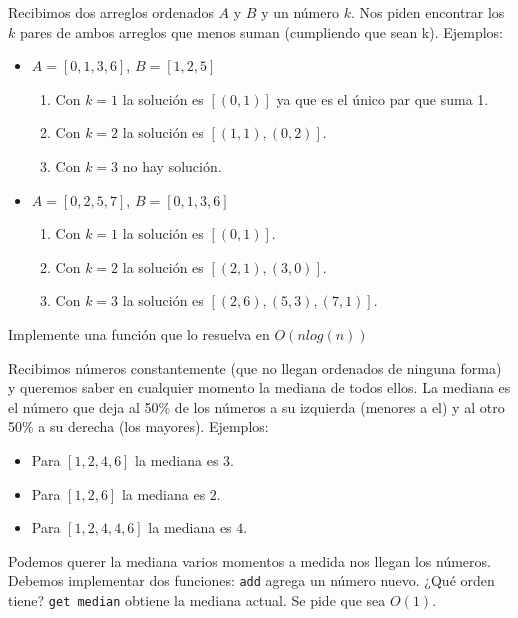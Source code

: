 \documentclass[titlepage,oneside]{book}
\begin{document}
\begin{Exercise}
    Recibimos dos arreglos ordenados $A$ y $B$ y un número $k$. Nos piden encontrar los $k$ pares de ambos arreglos que menos suman (cumpliendo que sean k). Ejemplos:
    \begin{itemize}
      \item $A = [0, 1, 3, 6]$, $B = [1, 2, 5]$
      \begin{enumerate}
        \item Con $k=1$ la solución es $[(0, 1)]$ ya que es el único par que suma 1.
        \item Con $k=2$ la solución es $[(1, 1), (0, 2)]$.
        \item Con $k=3$ no hay solución.
      \end{enumerate}
      \item $A = [0, 2, 5, 7]$, $B = [0, 1, 3, 6]$
      \begin{enumerate}
        \item Con $k=1$ la solución es $[(0, 1)]$.
        \item Con $k=2$ la solución es $[(2, 1), (3, 0)]$.
        \item Con $k=3$ la solución es $[(2, 6), (5, 3), (7, 1)]$.
      \end{enumerate}
    \end{itemize}
    Implemente una función que lo resuelva en $O(n log(n))$
\end{Exercise}

\begin{Exercise}
Recibimos números constantemente (que no llegan ordenados de ninguna forma) y queremos saber en cualquier momento la mediana de todos ellos. La mediana es el número que deja al 50\% de los números a su izquierda (menores a el) y al otro 50\% a su derecha (los mayores).
Ejemplos:
\begin{itemize}
    \item Para $[1,2,4,6]$ la mediana es $3$.
    \item Para $[1,2,6]$ la mediana es $2$.
    \item Para $[1,2,4,4,6]$ la mediana es $4$.
\end{itemize}

Podemos querer la mediana varios momentos a medida nos llegan los números. Debemos implementar dos funciones:
    \Question \texttt{add} agrega un número nuevo. ¿Qué orden tiene?
    \Question \texttt{get median} obtiene la mediana actual. Se pide que sea $O(1)$.
\end{Exercise}
\end{document}
